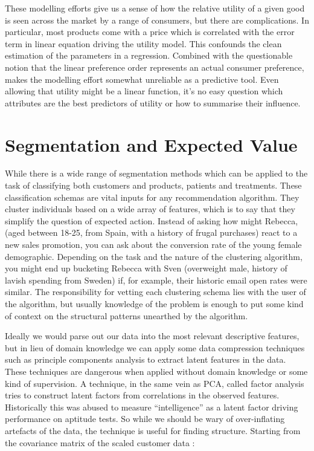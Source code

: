 \documentclass[]{tufte-book}
\theoremstyle{definition}
\theoremstyle{definition}
\theoremstyle{definition}
\theoremstyle{remark}
\begin{document}
These modelling efforts give us a sense of how the relative utility of a given good is seen across the market by a range of consumers, but there are complications. In particular, most products come with a price which is correlated with the error term in linear equation driving the utility model. This confounds the clean estimation of the parameters in a regression. Combined with the questionable notion that the linear preference order represents an actual consumer preference, makes the modelling effort somewhat unreliable as a predictive tool. Even allowing that utility might be a linear function, it's no easy question which attributes are the best predictors of utility or how to summarise their influence.

\hypertarget{segmentation-and-expected-value}{%
\section{Segmentation and Expected Value}\label{segmentation-and-expected-value}}

While there is a wide range of segmentation methods which can be applied to the task of classifying both customers and products, patients and treatments. These classification schemas are vital inputs for any recommendation algorithm. They cluster individuals based on a wide array of features, which is to say that they simplify the question of expected action. Instead of asking how might Rebecca, (aged between 18-25, from Spain, with a history of frugal purchases) react to a new sales promotion, you can ask about the conversion rate of the young female demographic. Depending on the task and the nature of the clustering algorithm, you might end up bucketing Rebecca with Sven (overweight male, history of lavish spending from Sweden) if, for example, their historic email open rates were similar. The responsibility for vetting each clustering schema lies with the user of the algorithm, but usually knowledge of the problem is enough to put some kind of context on the structural patterns unearthed by the algorithm.

Ideally we would parse out our data into the most relevant descriptive features, but in lieu of domain knowledge we can apply some data compression techniques such as principle components analysis to extract latent features in the data. These techniques are dangerous when applied without domain knowledge or some kind of supervision. A technique, in the same vein as PCA, called factor analysis tries to construct latent factors from correlations in the observed features. Historically this was abused to measure ``intelligence'' as a latent factor driving performance on aptitude tests. So while we should be wary of over-inflating artefacts of the data, the technique is useful for finding structure. Starting from the covariance matrix of the scaled customer data :
\end{document}
